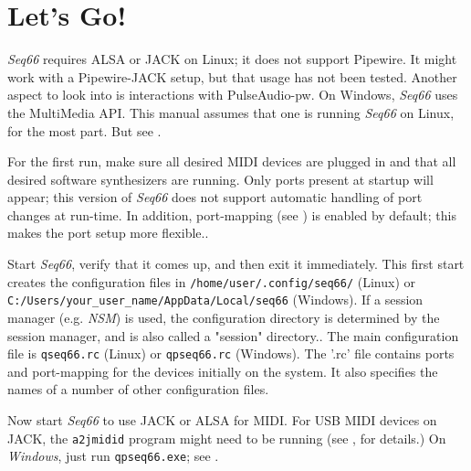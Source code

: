 %
%
%

\section{Let's Go!}
\label{sec:introduction_lets_go}

   \textsl{Seq66} requires ALSA or JACK on Linux;
   it does not support
   Pipewire.
   It might work with a Pipewire-JACK setup, but that usage has not been
   tested.
   Another aspect to look into is interactions with
   PulseAudio-pw.
   On Windows, \textsl{Seq66} uses the MultiMedia API.
   This manual assumes that one is running \textsl{Seq66} on Linux, for the
   most part.
   But see .

   For the first run, make sure all desired MIDI devices are plugged in and
   that all desired software synthesizers are running.
   Only ports present at startup will appear; this version of
   \textsl{Seq66} does not
   support automatic handling of port changes at run-time.
   In addition, port-mapping (see ) is
   enabled by default; this makes the port setup more flexible..

   Start \textsl{Seq66}, verify that it comes up, and then exit it
   immediately.
   This first start creates the configuration files in
   \texttt{/home/user/.config/seq66/} (Linux) or
   \texttt{C:/Users/your\_user\_name/AppData/Local/seq66} (Windows).
   If a session manager (e.g. \textsl{NSM})
   is used, the configuration directory is determined by
   the session manager, and is also called a "session" directory..
   The main configuration file is
   \texttt{qseq66.rc} (Linux) or
   \texttt{qpseq66.rc} (Windows).
   The '.rc' file contains ports and port-mapping for the devices
   initially on the system.
   It also specifies the names of a number of other configuration files.

   Now start \textsl{Seq66} to use JACK or ALSA for MIDI.
   For USB MIDI devices on JACK, the \texttt{a2jmidid} program might
   need to be running
   (see , for details.)
   On \textsl{Windows}, just run \texttt{qpseq66.exe};
   see .

